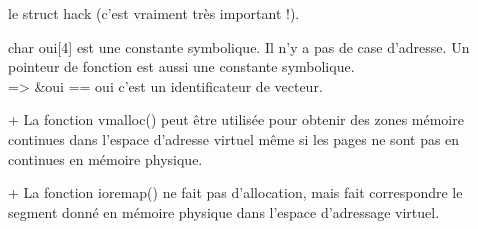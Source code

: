 \documentclass[11pt,a4paper]{report}
\begin{document}
le struct hack (c’est vraiment très important !).

char oui[4] est une constante symbolique. Il n’y a pas de case d’adresse. Un pointeur de fonction est aussi une constante symbolique.\\
=> \&oui == oui c’est un identificateur de vecteur.

+ La fonction vmalloc() peut être utilisée pour obtenir des zones mémoire continues dans l’espace d’adresse virtuel même si les pages ne sont pas en continues en mémoire physique.

+ La fonction ioremap() ne fait pas d’allocation, mais fait correspondre le segment donné en mémoire physique dans l’espace d’adressage virtuel. 


\chapter{}
\end{document}
